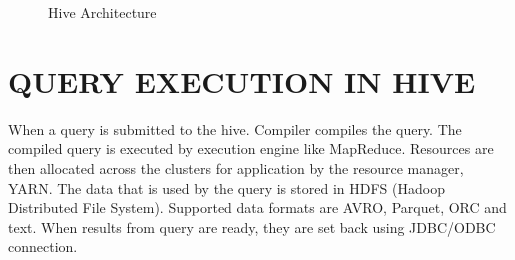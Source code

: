 \documentclass[9pt,twocolumn,twoside]{../../styles/osajnl}
\begin{document}
\begin{figure}[htbp]
	\centering
	\caption{Hive Architecture}
	\label{fig:Hive-arch}
\end{figure} 

\section{QUERY EXECUTION IN HIVE}
When a query is submitted to the hive.
Compiler compiles the query.
The compiled query is executed by execution engine like MapReduce.
Resources are then allocated across the clusters for application by the resource manager, YARN.
The data that is used by the query is stored in HDFS (Hadoop Distributed File System). Supported data formats are AVRO, Parquet, ORC and text.\newline
When results from query are ready, they are set back using JDBC/ODBC connection.
\cite{ht}
\end{document}
